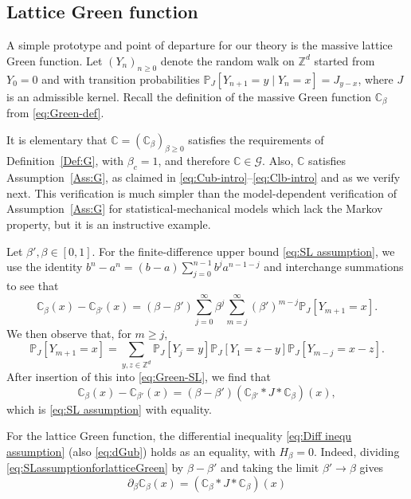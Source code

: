 \documentclass[11pt,a4paper]{article}
\numberwithin{equation}{section}
\theoremstyle{plain}
\theoremstyle{definition}
\newcommand\1{\mathds{1}}
\begin{document}
\subsection{Lattice Green function}
\label{sec:Green}


A simple prototype and point of departure
for our theory is the massive lattice Green function.
Let $(Y_n)_{n \ge 0}$ denote the random walk on $\mathbb Z^d$ started from
$Y_0=0$ and with transition probabilities $\mathbb P_J[Y_{n+1}=y\mid Y_n=x]=J_{y-x}$,
where $J$ is an admissible kernel. Recall the definition of the massive Green function $\mathbb C_\beta$ from \eqref{eq:Green-def}.

It is elementary that $\mathbb C=(\mathbb C_\beta)_{\beta\geq 0}$
satisfies the requirements of Definition~\ref{Def:G}, with $\beta_c=1$, and therefore $\mathbb C \in \mathcal G$.
Also, $\mathbb C$ satisfies Assumption~\ref{Ass:G}, as claimed in
\eqref{eq:Cub-intro}--\eqref{eq:Clb-intro} and as we verify next.
This verification is much simpler than the
model-dependent verification of Assumption~\ref{Ass:G} for statistical-mechanical
models which lack the Markov property, but it is an instructive example.



Let $\beta',\beta \in [0,1]$.
For the finite-difference upper bound \eqref{eq:SL assumption}, we use the identity
$b^n-a^n = (b-a)\sum_{j=0}^{n-1}b^ja^{n-1-j}$ and interchange summations
to see that
\begin{equation}
\label{eq:Green-SL}
    \mathbb C_\beta(x) - \mathbb C_{\beta'}(x)
    =
    (\beta-\beta')\sum_{j=0}^\infty \beta^j \sum_{m=j}^\infty (\beta')^{m-j}
    \mathbb P_J[Y_{m+1}=x].
\end{equation}
We then observe that, for $m \ge j$,
\begin{equation}
    \mathbb P_J[Y_{m+1}=x]
    =
    \sum_{y,z\in\mathbb Z^d} \mathbb P_J[Y_{j}=y] \mathbb P_J[Y_{1}=z-y] \mathbb P_J[Y_{m-j}=x -z] .
\end{equation}
After insertion of this into \eqref{eq:Green-SL}, we find that
\begin{equation}\label{eq:SLassumptionforlatticeGreen}
    \mathbb C_\beta(x) - \mathbb C_{\beta'}(x)
    =
    (\beta-\beta')(\mathbb C_{\beta'}*J*\mathbb C_\beta)(x),
\end{equation}
which is \eqref{eq:SL assumption} with equality.

For the lattice Green function, the differential inequality
\eqref{eq:Diff inequ assumption} (also \eqref{eq:dGub})
holds as an equality,
with $H_\beta =0$. Indeed, dividing \eqref{eq:SLassumptionforlatticeGreen} by $\beta-\beta'$ and taking the limit $\beta'\rightarrow \beta$ gives
\begin{equation}
	\partial_\beta \mathbb C_\beta(x)=(\mathbb C_{\beta}*J*\mathbb C_\beta)(x)
\end{equation}
\end{document}
